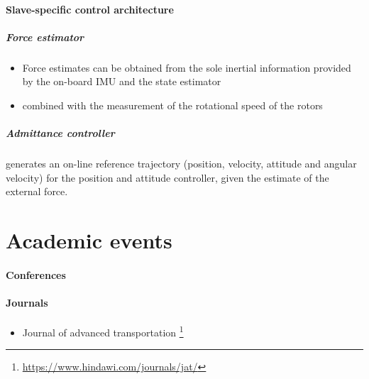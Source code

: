 \documentclass{article}
\begin{document}
		\paragraph{Slave-specific control architecture}
			\subparagraph{Force estimator}
				\begin{itemize}
					\item Force estimates can be obtained from the sole inertial information provided by the on-board IMU and the state estimator
					\item combined with the measurement of the rotational speed of the rotors
				\end{itemize}
			\subparagraph{Admittance controller}
				 generates an on-line reference trajectory (position, velocity, attitude and angular velocity) for the position and attitude controller, given the estimate of the external force.
	\section{Academic events}
		\paragraph{Conferences}
		\paragraph{Journals}
			\begin{itemize}
				\item Journal of advanced transportation \footnote{\url{https://www.hindawi.com/journals/jat/}} 
			\end{itemize}
	
\end{document}
